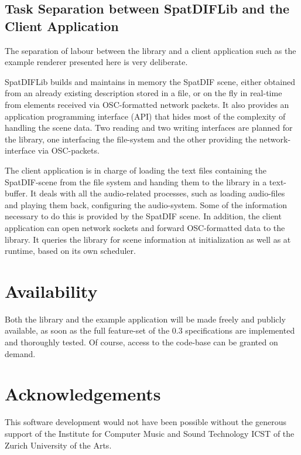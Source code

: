 \documentclass[a4paper]{article}
\begin{document}
\subsection{Task Separation between SpatDIFLib and the Client Application}

The separation of labour between the library and a client application such as the example renderer presented here is very deliberate.

SpatDIFLib builds and maintains in memory the SpatDIF scene, either obtained from an already existing description stored in a file, or on the fly in real-time from elements received via OSC-formatted network packets.
It also provides an application programming interface (API) that hides most of the complexity of handling the scene data.
Two reading and two writing interfaces are planned for the library, one interfacing the file-system and the other providing the network-interface via OSC-packets.

The client application is in charge of loading the text files containing the SpatDIF-scene from the file system and handing them to the library in a text-buffer.
It deals with all the audio-related processes, such as loading audio-files and playing them back, configuring the audio-system.
Some of the information necessary to do this is provided by the SpatDIF scene.
In addition, the client application can open network sockets and forward OSC-formatted data to the library.
It queries the library for scene information at initialization as well as at runtime, based on its own scheduler.

\section{Availability}%

Both the library and the example application will be made freely and publicly available, as soon as the full feature-set of the 0.3 specifications are implemented and thoroughly tested.
Of course, access to the code-base can be granted on demand.

\section{Acknowledgements}%

This software development would not have been possible without the generous support of the Institute for Computer Music and Sound Technology ICST of the Zurich University of the Arts.
\end{document}
